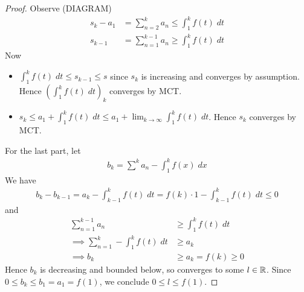 \documentclass{../template/note}
\begin{document}
    \begin{proof}
        Observe (DIAGRAM)
        \begin{align*}
            s_k - a_1 &= \sum_{n=2}^k a_n \leq \int_1^k f(t) \; dt \\
            s_{k-1} &= \sum_{n=1}^{k-1} a_n \geq \int_1^k f(t) \; dt
        \end{align*}
        Now
        \begin{itemize}
            \item[\(\implies\)] \(\int_1^k f(t) \; dt \leq s_{k-1} \leq s\) since \(s_k\) is increasing and converges by assumption. Hence \((\int_1^k f(t) \; dt)_k\) converges by MCT.
            \item[\(\impliedby\)] \(s_k \leq a_1 + \int_1^k f(t) \; dt \leq a_1 + \lim_{k \to \infty}\int_1^k f(t) \; dt\). Hence \(s_k\) converges by MCT. 
        \end{itemize}
        For the last part, let
        \begin{align*}
            b_k = \sum^k a_n - \int_1^k f(x) \; dx
        \end{align*}
        We have
        \begin{align*}
            b_k - b_{k-1} = a_k - \int_{k-1}^k f(t) \; dt = f(k) \cdot 1 - \int_{k-1}^k f(t) \; dt \leq 0
        \end{align*}
        and
        \begin{align*}
            \sum_{n=1}^{k-1} a_n &\geq \int_1^k f(t) \; dt \\
            \implies \sum_{n=1}^k - \int_1^k f(t) \; dt &\geq a_k \\
            \implies b_k &\geq a_k = f(k) \geq 0
        \end{align*}
        Hence \(b_k\) is decreasing and bounded below, so converges to some \(l \in \mathbb R\). Since \(0 \leq b_k \leq b_1 = a_1 = f(1)\), we conclude \(0 \leq l \leq f(1)\).
    \end{proof}
\end{document}
